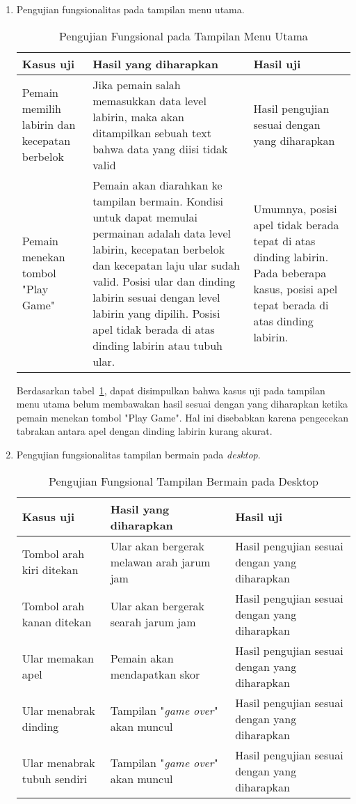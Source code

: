 \begin{enumerate}
	\item Pengujian fungsionalitas pada tampilan menu utama.
	
	\begin{table}[H]
		\caption{Pengujian Fungsional pada Tampilan Menu Utama} \label{tab:table1}
		\begin{tabular}{| m{4cm} | m{6cm}  | m{4cm} |}
			\hline
			Kasus uji & Hasil yang diharapkan & Hasil uji \\ \hline
			Pemain memilih labirin dan kecepatan berbelok & Jika pemain salah memasukkan data level labirin, maka akan ditampilkan sebuah text bahwa data yang diisi tidak valid & Hasil pengujian sesuai dengan yang diharapkan\\ \hline
			Pemain menekan tombol "Play Game" & Pemain akan diarahkan ke tampilan bermain. Kondisi untuk dapat memulai permainan adalah data level labirin, kecepatan berbelok dan kecepatan laju ular sudah valid. Posisi ular dan dinding labirin sesuai dengan level labirin yang dipilih. Posisi apel tidak berada di atas dinding labirin atau tubuh ular. & Umumnya, posisi apel tidak berada tepat di atas dinding labirin. Pada beberapa kasus, posisi apel tepat berada di atas dinding labirin.\\ \hline
		\end{tabular}
	\end{table}
	
	Berdasarkan tabel~\ref{tab:table1}, dapat disimpulkan bahwa kasus uji pada tampilan menu utama belum membawakan hasil sesuai dengan yang diharapkan ketika pemain menekan tombol "Play Game". Hal ini disebabkan karena pengecekan tabrakan antara apel dengan dinding labirin kurang akurat. 
	
	\item Pengujian fungsionalitas tampilan bermain pada \textit{desktop}.
	
	\begin{table}[H]
		\caption{Pengujian Fungsional Tampilan Bermain pada Desktop} \label{tab:table2}
		\begin{tabular}{| m{4cm} | m{6cm}  | m{4cm} |}
			\hline
			Kasus uji & Hasil yang diharapkan & Hasil uji \\ \hline
			Tombol arah kiri ditekan & Ular akan bergerak melawan arah jarum jam & Hasil pengujian sesuai dengan yang diharapkan\\ \hline
			Tombol arah kanan ditekan & Ular akan bergerak searah jarum jam & Hasil pengujian sesuai dengan yang diharapkan\\ \hline
			Ular memakan apel & Pemain akan mendapatkan skor & Hasil pengujian sesuai dengan yang diharapkan\\ \hline
			Ular menabrak dinding & Tampilan "\textit{game over}" akan muncul & Hasil pengujian sesuai dengan yang diharapkan\\ \hline
			Ular menabrak tubuh sendiri & Tampilan "\textit{game over}" akan muncul & Hasil pengujian sesuai dengan yang diharapkan\\ \hline 
		\end{tabular}
	\end{table}
	

\end{enumerate}
